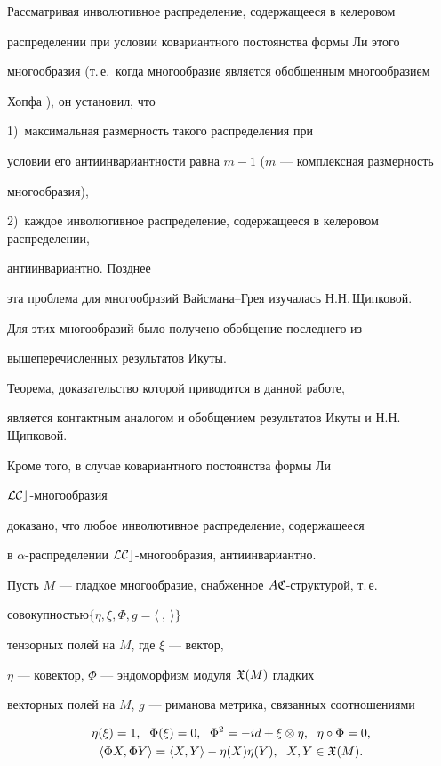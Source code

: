 Рассматривая инволютивное распределение, содержащееся в келеровом 


распределении при условии ковариантного постоянства формы Ли этого


многообразия (т.\,е.\ когда многообразие является обобщенным многообразием


Хопфа \cite{7}), он установил, что


1)~максимальная размерность такого распределения при 


условии его антиинвариантности равна $m-1$ ($m$ --- комплексная размерность 


многообразия), 


2)~каждое инволютивное распределение, содержащееся в келеровом распределении,


антиинвариантно. Позднее 


эта проблема для многообразий Вайсмана--Грея изучалась Н.Н.\,Щипковой. 


Для этих многообразий было получено обобщение последнего из 


вышеперечисленных результатов Икуты. 


Теорема, доказательство которой приводится в данной работе, 


является контактным аналогом и обобщением результатов Икуты и Н.Н.\,Щипковой.


Кроме того, в случае ковариантного постоянства формы Ли


$\cal LCc$-многообразия 


доказано, что любое инволютивное распределение, содержащееся 


в $\alpha$-распределении $\cal LCc$-многообразия, антиинвариантно.





Пусть $M$ --- гладкое многообразие, снабженное $A\frak C$-структурой, т.\,е. 


совокупностью\linebreak $\{\eta,\xi,\Phi,g=\langle\ ,\ \rangle\}$


тензорных полей на $M$, где $\xi$ --- вектор,


$\eta$ --- ковектор, $\Phi$ --- эндоморфизм модуля $\frak X(M)$ гладких 


векторных полей на $M$, $g$ --- риманова метрика, связанных соотношениями


\begin{gather*}


\eta(\xi)=1,\ \;\Phi(\xi)=0,\ \;\Phi^2=-id+\xi\otimes\eta,


\ \;\eta\circ\Phi=0, \\


%


\langle\Phi X,\Phi Y \rangle=\langle X,Y\rangle-\eta(X)\eta(Y),


\ \;X,Y\in\frak X(M).


\end{gather*}





